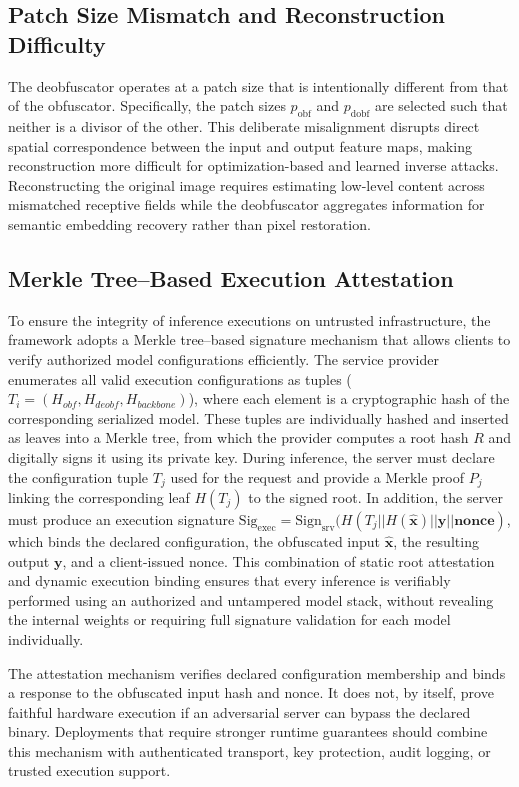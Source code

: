 \documentclass{ieeeaccess}
\newcommand{\rev}[1]{{\color{green}#1}}
\begin{document}
\subsection{\rev{Patch Size Mismatch and Reconstruction Difficulty}}
\rev{The deobfuscator operates at a patch size that is intentionally different from that of the obfuscator. Specifically, the patch sizes $p_{\text{obf}}$ and $p_{\text{dobf}}$ are selected such that neither is a divisor of the other. This deliberate misalignment disrupts direct spatial correspondence between the input and output feature maps, making reconstruction more difficult for optimization-based and learned inverse attacks. Reconstructing the original image requires estimating low-level content across mismatched receptive fields while the deobfuscator aggregates information for semantic embedding recovery rather than pixel restoration.}

\subsection{Merkle Tree--Based Execution Attestation}
To ensure the integrity of inference executions on untrusted infrastructure, the framework adopts a Merkle tree--based signature mechanism that allows clients to verify authorized model configurations efficiently. The service provider enumerates all valid execution configurations as tuples ($T_i = (H_{obf},H_{deobf},H_{backbone})$), where each element is a cryptographic hash of the corresponding serialized model. These tuples are individually hashed and inserted as leaves into a Merkle tree, from which the provider computes a root hash $R$ and digitally signs it using its private key. During inference, the server must declare the configuration tuple $T_j$ used for the request and provide a Merkle proof $P_j$ linking the corresponding leaf $H(T_j)$ to the signed root. In addition, the server must produce an execution signature $\textrm{Sig}_{\text{exec}} = \textrm{Sign}_{\text{srv}}(H(T_j||H(\hat{\textbf{x}})||\textbf{y}||\textbf{nonce})$, which binds the declared configuration, the obfuscated input $\hat{\mathbf{x}}$, the resulting output $\mathbf{y}$, and a client-issued nonce. This combination of static root attestation and dynamic execution binding ensures that every inference is verifiably performed using an authorized and untampered model stack, without revealing the internal weights or requiring full signature validation for each model individually.

\rev{The attestation mechanism verifies declared configuration membership and binds a response to the obfuscated input hash and nonce. It does not, by itself, prove faithful hardware execution if an adversarial server can bypass the declared binary. Deployments that require stronger runtime guarantees should combine this mechanism with authenticated transport, key protection, audit logging, or trusted execution support.}
\end{document}
